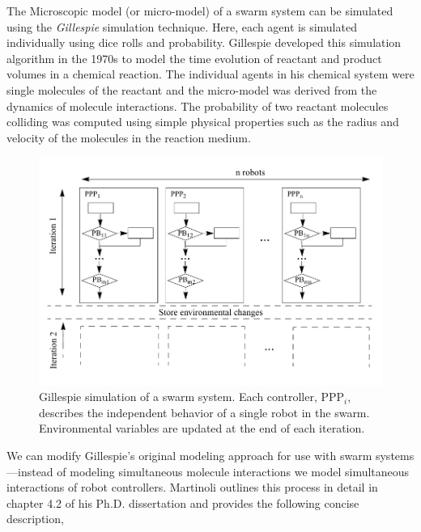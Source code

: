 \documentclass[Main.tex]{subfiles}
\begin{document}
The Microscopic model (or micro-model) of a swarm system can be simulated using the \emph{Gillespie} simulation technique\cite{Gillespie1976, Gillespie1977}. Here, each agent is simulated individually using dice rolls and probability. Gillespie developed this simulation algorithm in the 1970s to model the time evolution of reactant and product volumes in a chemical reaction. The individual agents in his chemical system were single molecules of the reactant and the micro-model was derived from the dynamics of molecule interactions. The probability of two reactant molecules colliding was computed using simple physical properties such as the radius and velocity of the molecules in the reaction medium\cite{Gillespie1976}. 
\begin{figure}[!t]
\centering\includegraphics[width=15cm]{assets/martinoliModelMethod.png}
\centering\caption{Gillespie simulation of a swarm system. Each controller, PPP$_i$, describes the independent behavior of a single robot in the swarm. Environmental variables are updated at the end of each iteration.}\label{fig:micromodel}
\end{figure}

We can modify Gillespie's original modeling approach for use with swarm systems---instead of modeling simultaneous molecule interactions we model simultaneous interactions of robot controllers. Martinoli outlines this process in detail in chapter 4.2 of his Ph.D. dissertation\cite{Martinoli1999b} and provides the following concise description,
\end{document}
